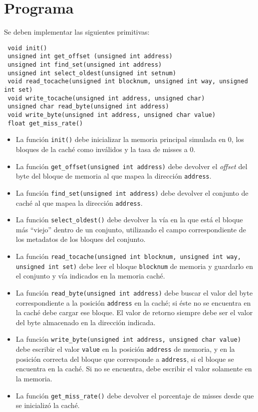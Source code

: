 \documentclass[a4paper,11pt]{article}
\begin{document}
\section{Programa}
\label{secc::prog}
 Se deben implementar las siguientes primitivas:
\begin{verbatim}
 void init()
 unsigned int get_offset (unsigned int address)
 unsigned int find_set(unsigned int address)
 unsigned int select_oldest(unsigned int setnum)
 void read_tocache(unsigned int blocknum, unsigned int way, unsigned int set)
 void write_tocache(unsigned int address, unsigned char)
 unsigned char read_byte(unsigned int address)
 void write_byte(unsigned int address, unsigned char value)
 float get_miss_rate()
\end{verbatim}

\begin{itemize}
\item La función \texttt{init()} debe inicializar la memoria principal simulada en 0, los bloques de la caché como inválidos y la tasa de misses a 0. 
\item La función \texttt{get\_offset(unsigned int address)} debe devolver el \emph{offset} del byte del bloque de memoria al que mapea la dirección \texttt{address}.
\item La función \texttt{find\_set(unsigned int address)} debe devolver el conjunto de
caché al que mapea la dirección \texttt{address}.
\item La función \texttt{select\_oldest()} debe devolver la vía en la que está el bloque más ``viejo'' dentro de un conjunto, utilizando el campo correspondiente de los metadatos de los bloques del conjunto.
\item La función \texttt{read\_tocache(unsigned int blocknum, unsigned int way, unsigned int set)} debe leer el bloque \texttt{blocknum} de memoria y guardarlo en el conjunto y vía indicados en la memoria caché.
\item La función \texttt{read\_byte(unsigned int address)} debe buscar el valor del byte correspondiente a la posición \texttt{address} en la caché; si éste no se encuentra en la caché debe cargar ese bloque. El valor de retorno siempre debe ser el valor del byte almacenado en la dirección indicada. 
\item La función \texttt{write\_byte(unsigned int address, unsigned char value)} debe escribir el valor \texttt{value} en la posición \texttt{address} de memoria, y en la posición correcta del bloque que corresponde a \texttt{address}, si el bloque se encuentra en la caché. Si no se encuentra, debe escribir el valor solamente en la memoria.
\item La función \texttt{get\_miss\_rate()} debe devolver el porcentaje de misses desde que se inicializó la caché.
\end{itemize}
\end{document}
